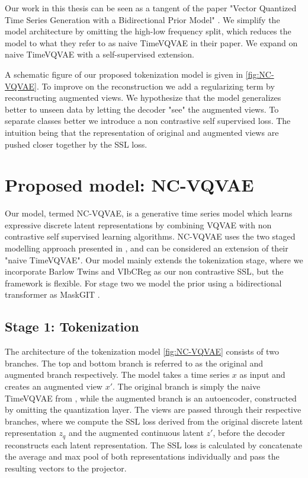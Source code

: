 \documentclass[../../thesis.tex]{subfiles}
\begin{document}
Our work in this thesis can be seen as a tangent of the paper "Vector Quantized Time Series Generation with a Bidirectional Prior Model" \cite{TimeVQVAE}. 
We simplify the model architecture by omitting the high-low frequency split, which reduces the model to what they refer to as naive TimeVQVAE in their paper. We expand on naive TimeVQVAE  with a self-supervised extension. \newline

A schematic figure of our proposed tokenization model is given in \ref{fig:NC-VQVAE}. To improve on the reconstruction we add a regularizing term by reconstructing augmented views. We hypothesize that the model generalizes better to unseen data by letting the decoder "see" the augmented views.\newline
To separate classes better we introduce a non contrastive self supervised loss. The intuition being that the representation of original and augmented views are pushed closer together by the SSL loss.\newline

\section{Proposed model: NC-VQVAE}

Our model, termed NC-VQVAE, is a generative time series model which learns expressive discrete latent representations by combining VQVAE \cite{VQVAE} with non contrastive self supervised learning algorithms. NC-VQVAE uses the two staged modelling approach presented in \cite{TimeVQVAE}, and can be considered an extension of their "naive TimeVQVAE". Our model mainly extends the tokenization stage, where we incorporate Barlow Twins \cite{zbontar2021barlow} and VIbCReg \cite{lee2024computer} as our non contrastive SSL, but the framework is flexible. For stage two we model the prior using a bidirectional transformer as MaskGIT \cite{chang2022maskgit}.

\subsection{Stage 1: Tokenization}

The architecture of the tokenization model \ref{fig:NC-VQVAE} consists of two branches. The top and bottom branch is referred to as the original and augmented branch respectively. The model takes a time series $x$ as input and creates an augmented view $x'$. The original branch is simply the naive TimeVQVAE from \cite{TimeVQVAE}, while the augmented branch is an autoencoder, constructed by omitting the quantization layer. The views are passed through their respective branches, where we compute the SSL loss derived from the original discrete latent representation $z_q$ and the augmented continuous latent $z'$, before the decoder reconstructs each latent representation. \newline 
The SSL loss is calculated by concatenate the average and max pool of both representations individually and pass the resulting vectors to the projector. \newline
\end{document}
